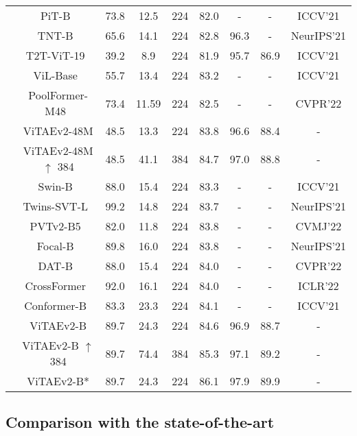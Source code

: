 \documentclass[twocolumn]{svjour3}          \smartqed  \usepackage{natbib}
\begin{document}
\begin{table*}[htbp]
{\begin{tabular}{c|c|ccc|cc|c|c}
          & PiT-B~\citep{heo2021rethinking} & 73.8  & 12.5  & 224   & 82.0  & -     & - & ICCV'21 \\
          & TNT-B~\citep{han2021transformer} & 65.6  & 14.1  & 224   & 82.8  & 96.3  & - & NeurIPS'21 \\
          & T2T-ViT-19~\citep{yuan2021tokens} & 39.2  & 8.9   & 224   & 81.9  & 95.7  & 86.9 & ICCV'21 \\
        & ViL-Base~\citep{zhang2021multi} & 55.7  &  13.4 & 224   & 83.2  & - & - & ICCV'21 \\
        & PoolFormer-M48~\citep{yu2022metaformer} &  73.4 & 11.59 & 224 & 82.5 & - & - & CVPR'22 \\
          & {ViTAEv2-48M} &    48.5   &    13.3   & 224   & 83.8 & 96.6 & 88.4 & - \\
          & {ViTAEv2-48M $\uparrow$ 384} &  48.5   &   41.1    & 384   & 84.7 & 97.0 & 88.8 & -  \\
        \cline{2-9}
          & Swin-B~\citep{liu2021swin} & 88.0  & 15.4 & 224   & 83.3  & - & - & ICCV'21 \\
          & Twins-SVT-L~\citep{chu2021twins} & 99.2  & 14.8 & 224   & 83.7  & - & - & NeurIPS'21 \\
          & PVTv2-B5~\citep{wang2021pvtv2} & 82.0  & 11.8 & 224   & 83.8  & - & - & CVMJ'22 \\
          & Focal-B~\citep{yang2021focal} & 89.8  & 16.0 & 224   & 83.8  & - & - &  NeurIPS'21 \\
          & DAT-B~\citep{xia2022vision} & 88.0  & 15.4 & 224   & 84.0  & - & - & CVPR'22 \\
          & CrossFormer~\citep{wang2021crossformer} & 92.0  & 16.1 & 224   & 84.0  & - & - & ICLR'22 \\
          & Conformer-B~\citep{peng2021conformer} & 83.3  & 23.3 & 224   & 84.1  & - & - & ICCV'21 \\
          & {ViTAEv2-B} & 89.7  &   24.3    & 224   & 84.6  & 96.9  & 88.7 & - \\
          & {ViTAEv2-B $\uparrow$ 384} & 89.7  &     74.4  & 384   & 85.3  & 97.1  & 89.2 & - \\
          & {ViTAEv2-B*} & 89.7  &  24.3  &   224 &   86.1    & 97.9 & 89.9 & -\\
          \hline
    \end{tabular}}\label{tab:ViTAESuppSota1}\end{table*}

\subsection{Comparison with the state-of-the-art}
\end{document}
